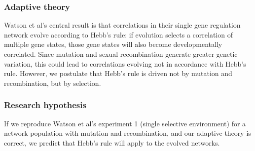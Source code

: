 \documentclass{article}
\begin{document}
\subsubsection{Adaptive theory}
Watson et al’s central result is that correlations in their single gene regulation network evolve according to Hebb’s rule: if evolution selects a correlation of multiple gene states, those gene states will also become developmentally correlated. Since mutation and sexual recombination generate greater genetic variation, this could lead to correlations evolving not in accordance with Hebb's rule. However, we postulate that Hebb’s rule is driven not by mutation and recombination, but by selection.

\subsubsection{Research hypothesis}
If we reproduce Watson et al’s experiment 1 (single selective environment) for a network population with mutation and recombination, and our adaptive theory is correct, we predict that Hebb’s rule will apply to the evolved networks.








\begin{appendix}
  \listoffigures
  \listoftables
   
  
\end{appendix}
\end{document}
